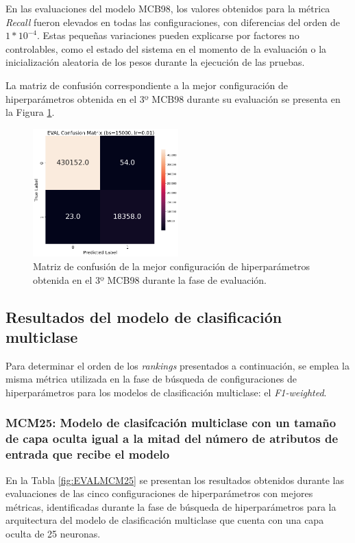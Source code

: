 En las evaluaciones del modelo MCB98, los valores obtenidos para la métrica \textit{Recall} fueron elevados en todas las configuraciones, con diferencias del orden de $1*10^{-4}$. Estas pequeñas variaciones pueden explicarse por factores no controlables, como el estado del sistema en el momento de la evaluación o la inicialización aleatoria de los pesos durante la ejecución de las pruebas.


La matriz de confusión correspondiente a la mejor configuración de hiperparámetros obtenida en el 3º MCB98 durante su evaluación se presenta en la Figura \ref{fig:MC_EVAL_MCB98}.

\begin{figure}[H]
    \centering
    \includegraphics[width=0.5\textwidth]{./img/evaluacion/matrices_confusion/MC_EVAL_MCB98.png}
    \caption{Matriz de confusión de la mejor configuración de hiperparámetros obtenida en el 3º MCB98 durante la fase de evaluación.}
    \label{fig:MC_EVAL_MCB98}
\end{figure}




\subsection{Resultados del modelo de clasificación multiclase}
Para determinar el orden de los \textit{rankings} presentados a continuación, se emplea la misma métrica utilizada en la fase de búsqueda de configuraciones de hiperparámetros para los modelos de clasificación multiclase: el \textit{F1-weighted}.

\subsubsection{MCM25: Modelo de clasifcación multiclase con un tamaño de capa oculta igual a la mitad del número de atributos de entrada que recibe el modelo}

En la Tabla \ref{fig:EVALMCM25} se presentan los resultados obtenidos durante las evaluaciones de las cinco configuraciones de hiperparámetros con mejores métricas, identificadas durante la fase de búsqueda de hiperparámetros para la arquitectura del modelo de clasificación multiclase que cuenta con una capa oculta de 25 neuronas.

